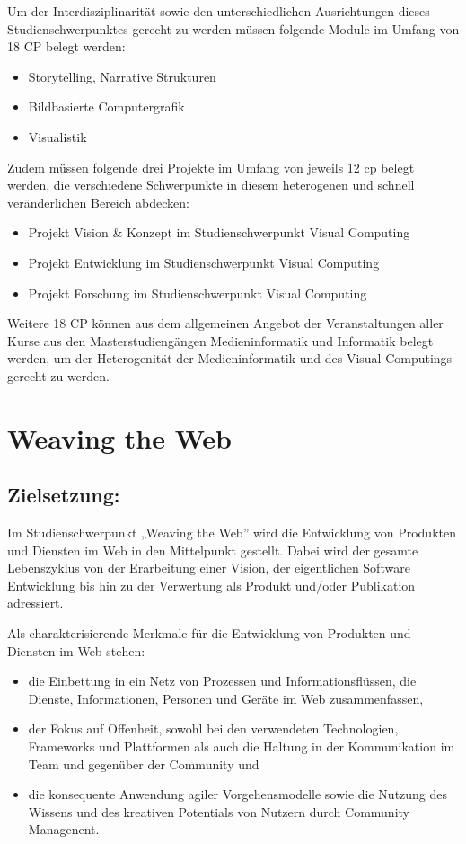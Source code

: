 Um der Interdisziplinarität sowie den unterschiedlichen Ausrichtungen
dieses Studienschwerpunktes gerecht zu werden müssen folgende Module im
Umfang von 18 CP belegt werden:

\begin{itemize}
\item
  Storytelling, Narrative Strukturen
\item
  Bildbasierte Computergrafik
\item
  Visualistik
\end{itemize}

Zudem müssen folgende drei Projekte im Umfang von jeweils 12 cp belegt
werden, die verschiedene Schwerpunkte in diesem heterogenen und schnell
veränderlichen Bereich abdecken:

\begin{itemize}
\item
  Projekt Vision \& Konzept im Studienschwerpunkt Visual Computing
\item
  Projekt Entwicklung im Studienschwerpunkt Visual Computing
\item
  Projekt Forschung im Studienschwerpunkt Visual Computing
\end{itemize}

Weitere 18 CP können aus dem allgemeinen Angebot der Veranstaltungen
aller Kurse aus den Masterstudiengängen Medieninformatik und Informatik
belegt werden, um der Heterogenität der Medieninformatik und des Visual
Computings gerecht zu werden.

\chapter{Weaving the Web}\label{weaving-the-web}

\section*{Zielsetzung:}\label{zielsetzung-1}

Im Studienschwerpunkt „Weaving the Web'' wird die Entwicklung von
Produkten und Diensten im Web in den Mittelpunkt gestellt. Dabei wird
der gesamte Lebenszyklus von der Erarbeitung einer Vision, der
eigentlichen Software Entwicklung bis hin zu der Verwertung als Produkt
und/oder Publikation adressiert.

Als charakterisierende Merkmale für die Entwicklung von Produkten und
Diensten im Web stehen:

\begin{itemize}
\item
  die Einbettung in ein Netz von Prozessen und Informationsflüssen, die
  Dienste, Informationen, Personen und Geräte im Web zusammenfassen,
\item
  der Fokus auf Offenheit, sowohl bei den verwendeten Technologien,
  Frameworks und Plattformen als auch die Haltung in der Kommunikation
  im Team und gegenüber der Community und
\item
  die konsequente Anwendung agiler Vorgehensmodelle sowie die Nutzung
  des Wissens und des kreativen Potentials von Nutzern durch Community
  Managenent.
\end{itemize}

